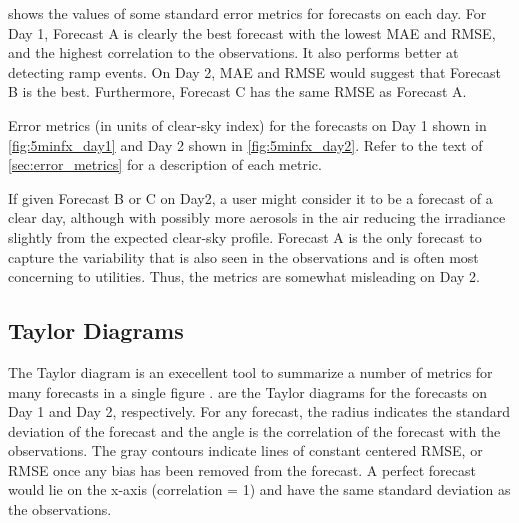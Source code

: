  shows the values of some standard error metrics
for forecasts on each day.
For Day 1, Forecast A is clearly the best forecast with the lowest
MAE and RMSE, and the highest correlation to the observations.
It also performs better at detecting ramp events.
On Day 2, MAE and RMSE would suggest that Forecast B is the best.
Furthermore, Forecast C has the same RMSE as Forecast A.

\begin{table}[htbp]
\centering
\caption[Error metrics for contrived test forecasts]{Error metrics (in units
of clear-sky index) for the forecasts on Day 1 shown in
\cref{fig:5minfx_day1} and Day 2 shown in
\cref{fig:5minfx_day2}. Refer to the text of \cref{sec:error_metrics}
for a description of each metric.}
\label{table:fx_errs}
\vspace{.3em}
\captionsetup{position=top}
\hspace{3em}
\end{table}

If given Forecast B or C on Day2, a user might consider it to be a
forecast of a clear day, although with possibly more aerosols in the
air reducing the irradiance slightly from the expected clear-sky
profile.
Forecast A is the only forecast to capture the variability that is
also seen in the observations and is often most concerning to
utilities.
Thus, the metrics are somewhat misleading on Day 2.

\subsection{Taylor Diagrams}
The Taylor diagram is an execellent tool to summarize a number of
metrics for many forecasts in a single figure \citep{Taylor2001}.
 are the Taylor diagrams for the
forecasts on Day 1 and Day 2, respectively.
For any forecast, the radius indicates the standard deviation of the
forecast and the angle is the correlation of the forecast with the
observations.
The gray contours indicate lines of constant centered RMSE, or RMSE
once any bias has been removed from the forecast.
A perfect forecast would lie on the x-axis (correlation = 1) and have
the same standard deviation as the observations.

